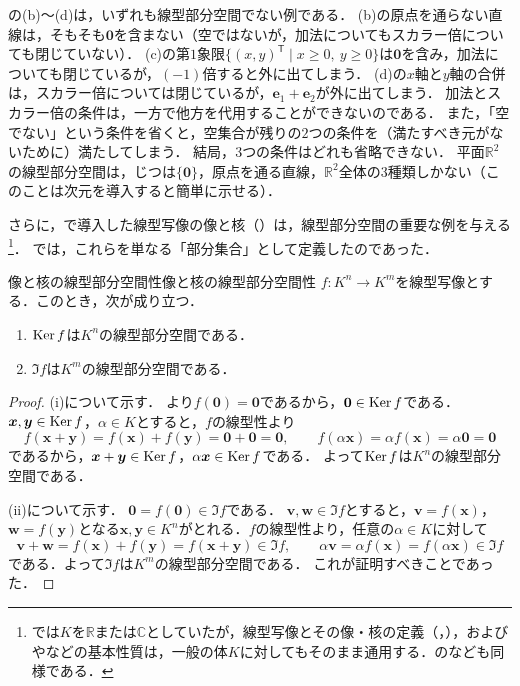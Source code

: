 の(b)〜(d)は，いずれも線型部分空間でない例である．
(b)の原点を通らない直線は，そもそも$\bm{0}$を含まない（空ではないが，加法についてもスカラー倍についても閉じていない）．
(c)の第$1$象限$\{(x,y)^\mathsf{T} \mid x\ge0,~y\ge0\}$は$\bm{0}$を含み，加法についても閉じているが，$(-1)$倍すると外に出てしまう．
(d)の$x$軸と$y$軸の合併は，スカラー倍については閉じているが，$\bm{e}_1+\bm{e}_2$が外に出てしまう．
加法とスカラー倍の条件は，一方で他方を代用することができないのである．
また，「空でない」という条件を省くと，空集合が残りの$2$つの条件を（満たすべき元がないために）満たしてしまう．
結局，$3$つの条件はどれも省略できない．
平面$\mathbb{R}^2$の線型部分空間は，じつは$\{\bm{0}\}$，原点を通る直線，$\mathbb{R}^2$全体の$3$種類しかない（このことは次元を導入すると簡単に示せる）．

さらに，で導入した線型写像の像と核（）は，線型部分空間の重要な例を与える\footnote{では$K$を$\mathbb{R}$または$\mathbb{C}$としていたが，線型写像とその像・核の定義（，），およびやなどの基本性質は，一般の体$K$に対してもそのまま通用する．のなども同様である．}．
では，これらを単なる「部分集合」として定義したのであった．

\begin{prop}{像と核の線型部分空間性}{像と核の線型部分空間性}
  $f \colon K^n \to K^m$を線型写像とする．このとき，次が成り立つ．
  \begin{enumerate}[label=(\roman*),leftmargin=3.2em]
    \item $\operatorname{Ker} f$は$K^n$の線型部分空間である．
    \item $\Im f$は$K^m$の線型部分空間である．
  \end{enumerate}
\end{prop}

\begin{tleftbar}
\begin{proof}
  (i)について示す．
  より$f(\bm{0}) = \bm{0}$であるから，$\bm{0} \in \operatorname{Ker} f$である．
  $\bm{x}, \bm{y} \in \operatorname{Ker} f$，$\alpha \in K$とすると，$f$の線型性より
  \[
    f(\bm{x} + \bm{y}) = f(\bm{x}) + f(\bm{y}) = \bm{0} + \bm{0} = \bm{0},
    \qquad
    f(\alpha\bm{x}) = \alpha f(\bm{x}) = \alpha\bm{0} = \bm{0}
  \]
  であるから，$\bm{x} + \bm{y} \in \operatorname{Ker} f$，$\alpha\bm{x} \in \operatorname{Ker} f$である．
  よって$\operatorname{Ker} f$は$K^n$の線型部分空間である．

  (ii)について示す．
  $\bm{0} = f(\bm{0}) \in \Im f$である．
  $\bm{v}, \bm{w} \in \Im f$とすると，$\bm{v} = f(\bm{x})$，$\bm{w} = f(\bm{y})$となる$\bm{x}, \bm{y} \in K^n$がとれる．$f$の線型性より，任意の$\alpha\in K$に対して
  \[
    \bm{v} + \bm{w} = f(\bm{x}) + f(\bm{y}) = f(\bm{x} + \bm{y}) \in \Im f,
    \qquad
    \alpha\bm{v} = \alpha f(\bm{x}) = f(\alpha\bm{x}) \in \Im f
  \]
  である．よって$\Im f$は$K^m$の線型部分空間である．
  これが証明すべきことであった．
\end{proof}
\end{tleftbar}

